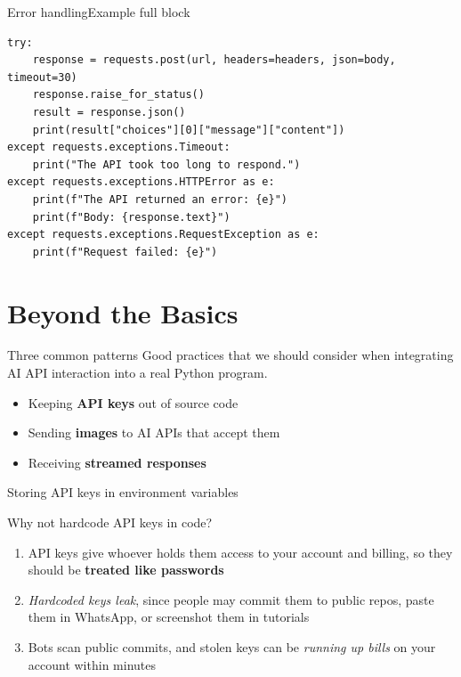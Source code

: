 \documentclass[aspectratio=169]{beamer}
\begin{document}
\begin{frame}[fragile]{Error handling}{Example full block}
    \begin{verbatim}
try:
    response = requests.post(url, headers=headers, json=body, timeout=30)
    response.raise_for_status()
    result = response.json()
    print(result["choices"][0]["message"]["content"])
except requests.exceptions.Timeout:
    print("The API took too long to respond.")
except requests.exceptions.HTTPError as e:
    print(f"The API returned an error: {e}")
    print(f"Body: {response.text}")
except requests.exceptions.RequestException as e:
    print(f"Request failed: {e}")
    \end{verbatim}
\note{
}
\end{frame}



\section{Beyond the Basics}

\begin{frame}{Three common patterns}
Good practices that we should consider when integrating AI API interaction into a real Python program.

    \begin{itemize}
\item Keeping \textbf{API keys} out of source code
\item Sending \textbf{images} to AI APIs that accept them
\item Receiving \textbf{streamed responses}
    \end{itemize}
\note{
}
\end{frame}


\begin{frame}[fragile]{Storing API keys in environment variables}
    \begin{block}{Why not hardcode API keys in code?}
\begin{enumerate}
\item API keys give whoever holds them access to your account and billing, so they should be \textbf{treated like passwords}
\item \textit{Hardcoded keys leak}, since people may commit them to public repos, paste them in WhatsApp, or screenshot them in tutorials
\item Bots scan public commits, and stolen keys can be \textit{running up bills} on your account within minutes
\end{enumerate}
    \end{block}
\note{
}
\end{frame}
\end{document}
